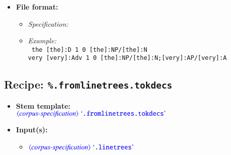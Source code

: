 \documentclass[12pt]{report}
\def\blue{\color{blue}}
\def\magenta{\color{magenta}}
\begin{document}
\begin{itemize}
      \item \textbf{File format:}
      \begin{itemize}
            \item \textit{Specification:}
            \item \textit{Example:}\\
            {\magenta\tt
            the [the]:D 1 0 [the]:NP/[the]:N\\
            very [very]:Adv 1 0 [the]:NP/[the]:N;[very]:AP/[very]:A\\
            }
      \end{itemize}
\end{itemize}

\subsection{Recipe: \blue\tt \%.fromlinetrees.tokdecs}

\begin{itemize}
      \item \textbf{Stem template:}\\
      $\dtype{corpus-specification} \ \dcode{.fromlinetrees.tokdecs}$
      \item \textbf{Input(s):}
      \begin{itemize}
            \item $\dtype{corpus-specification} \ \dcode{.linetrees}$
      \end{itemize}
\end{itemize}
\end{document}
